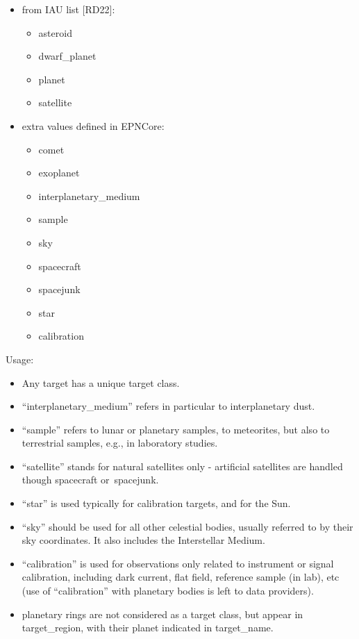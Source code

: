 \documentclass[11pt,a4paper]{ivoa}
\begin{document}
\begin{itemize}
\item from IAU list [RD22]:\begin{itemize}
\item asteroid
\item dwarf\_planet
\item planet
\item satellite
\end{itemize}


\item extra values defined in EPNCore:\begin{itemize}
\item comet
\item exoplanet
\item interplanetary\_medium
\item sample
\item sky
\item spacecraft
\item spacejunk
\item star
\item calibration
\end{itemize}


\end{itemize}

Usage:

\begin{itemize}
\item Any target has a unique target class.
\item ``interplanetary\_medium'' refers in particular to interplanetary dust.
\item ``sample'' refers to lunar or planetary samples, to meteorites, but also to terrestrial samples, e.g., in laboratory studies.
\item ``satellite'' stands for natural satellites only - artificial satellites are handled though spacecraft or spacejunk.
\item ``star'' is used typically for calibration targets, and for the Sun.
\item ``sky'' should be used for all other celestial bodies, usually referred to by their sky coordinates. It also includes the Interstellar Medium.
\item ``calibration'' is used for observations only related to instrument or signal calibration, including dark current, flat field, reference sample (in lab), etc (use of ``calibration'' with planetary bodies is left to data providers).
\item planetary rings are not considered as a target class, but appear in target\_region, with their planet indicated in target\_name.
\end{itemize}
\end{document}
